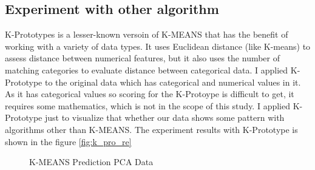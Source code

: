 \documentclass[12pt]{article}
\begin{document}
\subsection{Experiment with other algorithm}
K-Prototypes is a lesser-known versoin of K-MEANS that has the benefit of working with a variety of data types. It uses Euclidean distance (like K-means) to assess distance between numerical features, but it also uses the number of matching categories to evaluate distance between categorical data. I applied K-Prototype to the original data which has categorical and numerical values in it. As it has categorical values so scoring for the K-Protoype is difficult to get, it requires some mathematics, which is not in the scope of this study. I applied K-Prototype just to visualize that whether our data shows some pattern with algorithms other than K-MEANS. The experiment results with K-Prototype is shown in the figure \ref{fig:k_pro_re}
\begin{figure}[h!]
	\centering
	\qquad
	
	\caption{K-MEANS Prediction PCA Data}%
	\label{fig:kmeans_result_2d}%
\end{figure}
\end{document}
